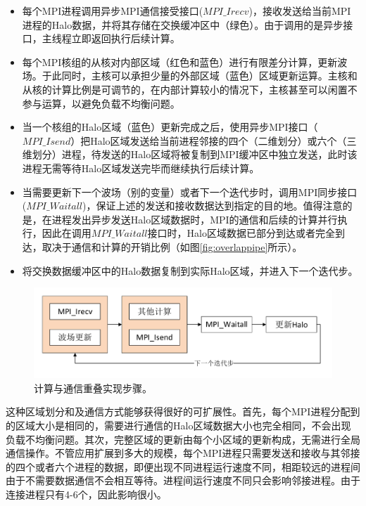 \documentclass[degree=doctor]{thuthesis}
\begin{document}
\begin{itemize}
  \item 每个MPI进程调用异步MPI通信接受接口($MPI\_Irecv$)，接收发送给当前MPI进程的Halo数据，并将其存储在交换缓冲区中（绿色）。由于调用的是异步接口，主线程立即返回执行后续计算。
  \item 每个MPI核组的从核对内部区域（红色和蓝色）进行有限差分计算，更新波场。于此同时，主核可以承担少量的外部区域（蓝色）区域更新运算。主核和从核的计算比例是可调节的，在内部计算较小的情况下，主核甚至可以闲置不参与运算，以避免负载不均衡问题。
  \item 当一个核组的Halo区域（蓝色）更新完成之后，使用异步MPI接口（$MPI\_Isend$）把Halo区域发送给当前进程邻接的四个（二维划分）或六个（三维划分）进程，待发送的Halo区域将被复制到MPI缓冲区中独立发送，此时该进程无需等待Halo区域发送完毕而继续执行后续计算。
  \item 当需要更新下一个波场（别的变量）或者下一个迭代步时，调用MPI同步接口($MPI\_Waitall$)，保证上述的发送和接收数据达到指定的目的地。值得注意的是，在进程发出异步发送Halo区域数据时，MPI的通信和后续的计算并行执行，因此在调用$MPI\_Waitall$接口时，Halo区域数据已部分到达或者完全到达，取决于通信和计算的开销比例（如图\ref{fig:overlappipe}所示）。
  \item 将交换数据缓冲区中的Halo数据复制到实际Halo区域，并进入下一个迭代步。
\end{itemize}

\begin{figure}[ht]
  \centering
  \includegraphics[width=1.0\columnwidth]{comp-comm-impl.pdf}
  \caption{计算与通信重叠实现步骤。}
  \label{fig:comp-comm-impl}
\end{figure}

这种区域划分和及通信方式能够获得很好的可扩展性。首先，每个MPI进程分配到的区域大小是相同的，需要进行通信的Halo区域数据大小也完全相同，不会出现负载不均衡问题。其次，完整区域的更新由每个小区域的更新构成，无需进行全局通信操作。不管应用扩展到多大的规模，每个MPI进程只需要发送和接收与其邻接的四个或者六个进程的数据，即便出现不同进程运行速度不同，相距较远的进程间由于不需要数据通信不会相互等待。进程间运行速度不同只会影响邻接进程。由于连接进程只有4-6个，因此影响很小。
\end{document}
